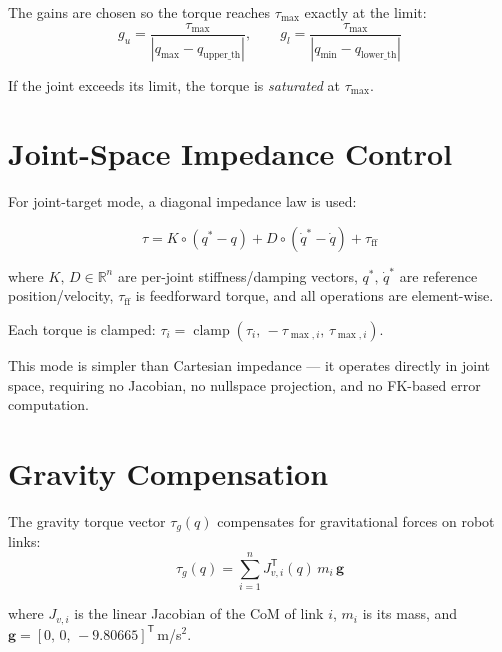 \documentclass[11pt,a4paper]{article}
\newcommand{\R}{\mathbb{R}}
\newcommand{\tr}{\mathsf{T}}
\newcommand{\clamp}{\operatorname{clamp}}
\newcommand{\odot}{\circ}  %
\begin{document}
The gains are chosen so the torque reaches $\tau_{\max}$ exactly at the limit:
\begin{equation}
  g_u = \frac{\tau_{\max}}{|q_{\max} - q_{\text{upper\_th}}|},
  \qquad
  g_l = \frac{\tau_{\max}}{|q_{\min} - q_{\text{lower\_th}}|}
  \label{eq:avoid_gains}
\end{equation}

If the joint exceeds its limit, the torque is \emph{saturated} at $\tau_{\max}$.


\section{Joint-Space Impedance Control}
\label{sec:joint_imp}

For joint-target mode, a diagonal impedance law is used:

\begin{keqbox}
\begin{equation}
  \tau
  = K \odot (q^* - q) + D \odot (\dot{q}^* - \dot{q}) + \tau_{\text{ff}}
  \label{eq:joint_imp}
\end{equation}
\end{keqbox}

where $K,\,D \in \R^n$ are per-joint stiffness/damping vectors,
$q^*,\,\dot{q}^*$ are reference position/velocity, $\tau_{\text{ff}}$ is
feedforward torque, and all operations are element-wise.

Each torque is clamped: $\tau_i = \clamp(\tau_i,\,-\tau_{\max,i},\,\tau_{\max,i})$.

This mode is simpler than Cartesian impedance --- it operates directly in joint
space, requiring no Jacobian, no nullspace projection, and no FK-based error
computation.


\section{Gravity Compensation}
\label{sec:gravity}

The gravity torque vector $\tau_g(q)$ compensates for gravitational forces on
robot links:
\begin{equation}
  \tau_g(q)
  = \sum_{i=1}^{n} J_{v,i}^\tr(q)\, m_i\, \mathbf{g}
  \label{eq:gravity}
\end{equation}

where $J_{v,i}$ is the linear Jacobian of the CoM of link $i$, $m_i$ is its
mass, and $\mathbf{g} = [0,\, 0,\, -9.80665]^\tr$\,m/s$^2$.
\end{document}
